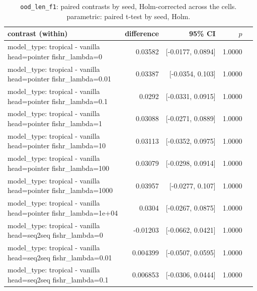 \documentclass[10pt]{article}
\makeatletter
\newcommand{\stackcell}[1]{\begin{tabular}[t]{@{}l@{}}#1\end{tabular}}
\makeatother
\begin{document}
{\small
\begin{longtable}{lrrrl}
\caption{\texttt{ood\_len\_f1}: paired contrasts by seed, Holm-corrected across the cells. parametric: paired t-test by seed, Holm.}\label{tab:paired-ood_len_f1}\\
\toprule
contrast (within) & difference & 95\% CI & $p$ & \\
\midrule
\endhead
\stackcell{model\_type: tropical - vanilla\\\footnotesize head=pointer fishr\_lambda=0 } & 0.03582 & [-0.0177, 0.0894] & 1.0000 & \\
\stackcell{model\_type: tropical - vanilla\\\footnotesize head=pointer fishr\_lambda=0.01 } & 0.03387 & [-0.0354, 0.103] & 1.0000 & \\
\stackcell{model\_type: tropical - vanilla\\\footnotesize head=pointer fishr\_lambda=0.1 } & 0.0292 & [-0.0331, 0.0915] & 1.0000 & \\
\stackcell{model\_type: tropical - vanilla\\\footnotesize head=pointer fishr\_lambda=1 } & 0.03088 & [-0.0271, 0.0889] & 1.0000 & \\
\stackcell{model\_type: tropical - vanilla\\\footnotesize head=pointer fishr\_lambda=10 } & 0.03113 & [-0.0352, 0.0975] & 1.0000 & \\
\stackcell{model\_type: tropical - vanilla\\\footnotesize head=pointer fishr\_lambda=100 } & 0.03079 & [-0.0298, 0.0914] & 1.0000 & \\
\stackcell{model\_type: tropical - vanilla\\\footnotesize head=pointer fishr\_lambda=1000 } & 0.03957 & [-0.0277, 0.107] & 1.0000 & \\
\stackcell{model\_type: tropical - vanilla\\\footnotesize head=pointer fishr\_lambda=1e+04 } & 0.0304 & [-0.0267, 0.0875] & 1.0000 & \\
\stackcell{model\_type: tropical - vanilla\\\footnotesize head=seq2seq fishr\_lambda=0 } & -0.01203 & [-0.0662, 0.0421] & 1.0000 & \\
\stackcell{model\_type: tropical - vanilla\\\footnotesize head=seq2seq fishr\_lambda=0.01 } & 0.004399 & [-0.0507, 0.0595] & 1.0000 & \\
\stackcell{model\_type: tropical - vanilla\\\footnotesize head=seq2seq fishr\_lambda=0.1 } & 0.006853 & [-0.0306, 0.0444] & 1.0000 & \\

\end{longtable}}
\end{document}
